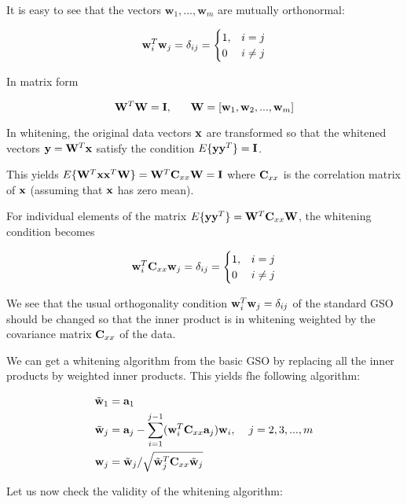 \documentclass[10pt]{article}
\begin{document}
\begin{enumerate}
It is easy to see that the vectors $\textbf{w}_1, ..., \textbf{w}_m$ are mutually
orthonormal: 

\[\mathbf{w}_i^T\mathbf{w}_j = \delta_{ij} = \begin{cases}1, &i=j\\0 &i\neq
j\end{cases}
\]

In matrix form

\[
\mathbf{W}^T\mathbf{W} = \mathbf{I}, \hspace{6mm}\mathbf{W} = [\mathbf{w}_1, \mathbf{w}_2, ..., \mathbf{w}_m]
\]

In whitening, the original data vectors $\mathbf{x}$ are transformed so
that the whitened vectors $\textbf{y}=\mathbf{W}^T\mathbf{x}$ satisfy the condition
$E\lbrace \textbf{y}\textbf{y}^T \rbrace=\mathbf{I}$.

This yields
$E\lbrace \mathbf{W}^T\mathbf{x}\mathbf{x}^T\mathbf{W}\rbrace=\mathbf{W}^T \textbf{C}_{xx} \mathbf{W}=\mathbf{I}$
where $\mathbf{C}_{xx}$ is the correlation matrix of $\mathbf{x}$
(assuming that $\mathbf{x}$ has zero mean).

For individual elements of the matrix $E\lbrace \mathbf{y}\mathbf{y}^T\rbrace=\mathbf{W}^T\mathbf{C}_{xx}\mathbf{W}$, the whitening condition becomes

\[
\mathbf{w}_i^T\mathbf{C}_{xx}\mathbf{w}_j = \delta_{ij} = \begin{cases}1, &i=j\\0 &i\neq
j\end{cases}
\]


We see that the usual orthogonality
condition $\mathbf{w}_i^T\mathbf{w}_j = \delta_{ij}$ of the standard GSO
should be changed so that the inner product is in whitening weighted by the covariance
matrix $\mathbf{C}_{xx}$ of the data.

We can get a whitening algorithm from the basic GSO by replacing all
the inner products by weighted inner products. This yields fhe
following algorithm:

\[
\begin{split}
\tilde{\mathbf{w}}_1 &= \mathbf{a}_1 \\
\tilde{\mathbf{w}}_j &= \mathbf{a}_j - \sum_{i=1}^{j-1}
(\mathbf{w}_i^T\mathbf{C}_{xx}\mathbf{a}_j)\mathbf{w}_i, \hspace{4mm} j=2,3,...,m \\
\mathbf{w}_j &= \tilde{\mathbf{w}}_j/\sqrt{\tilde{\mathbf{w}}_j^T\mathbf{C}_{xx}\tilde{\mathbf{w}}_j}
\end{split}
\]

Let us now check the validity of the whitening algorithm:


\end{enumerate}
\end{document}
